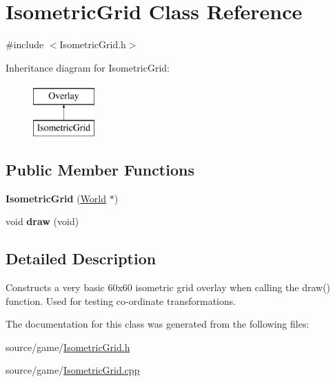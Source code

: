 \hypertarget{classIsometricGrid}{
\section{IsometricGrid Class Reference}
\label{classIsometricGrid}
}


{\ttfamily \#include $<$IsometricGrid.h$>$}

Inheritance diagram for IsometricGrid:\begin{figure}[H]
\begin{center}
\leavevmode
\includegraphics[height=2cm]{classIsometricGrid}
\end{center}
\end{figure}
\subsection*{Public Member Functions}
\begin{DoxyCompactItemize}
\item 
\hypertarget{classIsometricGrid_a4ac39773481a3937b415a71e8e7a29bd}{
{\bfseries IsometricGrid} (\hyperlink{classWorld}{World} $\ast$)}
\label{classIsometricGrid_a4ac39773481a3937b415a71e8e7a29bd}

\item 
\hypertarget{classIsometricGrid_a3138024ea901361f87a47c008fe4f31d}{
void {\bfseries draw} (void)}
\label{classIsometricGrid_a3138024ea901361f87a47c008fe4f31d}

\end{DoxyCompactItemize}


\subsection{Detailed Description}
Constructs a very basic 60x60 isometric grid overlay when calling the draw() function. Used for testing co-\/ordinate transformations. 

The documentation for this class was generated from the following files:\begin{DoxyCompactItemize}
\item 
source/game/\hyperlink{IsometricGrid_8h}{IsometricGrid.h}\item 
source/game/\hyperlink{IsometricGrid_8cpp}{IsometricGrid.cpp}\end{DoxyCompactItemize}
